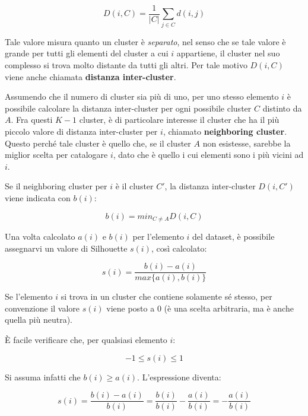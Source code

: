 \documentclass[12pt]{report}
\begin{document}
			\begin{equation*}
				D(i, C) = \frac{1}{|C|} \sum_{j \in C} d(i, j)
			\end{equation*}

			Tale valore misura quanto un cluster è \textit{separato}, nel senso
			che se tale valore è grande per tutti gli elementi del cluster a cui
			$i$ appartiene, il cluster nel suo complesso si trova molto distante
			da tutti gli altri. Per tale motivo $D(i, C)$ viene anche chiamata
			\textbf{distanza inter-cluster}.

			Assumendo che il numero di cluster sia più di uno, per uno stesso elemento
			$i$ è possibile calcolare la distanza inter-cluster per ogni possibile
			cluster $C$ distinto da $A$. Fra questi $K - 1$ cluster, è di particolare
			interesse il cluster che ha il più piccolo valore di distanza inter-cluster
			per $i$, chiamato \textbf{neighboring cluster}. Questo perché tale cluster
			è quello che, se il cluster $A$ non esistesse, sarebbe la miglior scelta
			per catalogare $i$, dato che è quello i cui elementi sono i più vicini ad
			$i$.

			Se il neighboring cluster per $i$ è il cluster $C'$, la distanza
			inter-cluster $D(i, C')$ viene indicata con $b(i)$:

			\begin{equation}
				b(i) = min_{C \neq A} D(i, C)
			\end{equation}

			Una volta calcolato $a(i)$ e $b(i)$ per l'elemento $i$ del dataset, è
			possibile assegnarvi un valore di Silhouette $s(i)$, così calcolato:

			\begin{equation}
				s(i) = \frac{b(i) - a(i)}{max\{a(i), b(i)\}}
			\end{equation}

			Se l'elemento $i$ si trova in un cluster che contiene solamente sé stesso,
			per convenzione il valore $s(i)$ viene posto a $0$ (è una scelta arbitraria,
			ma è anche quella più neutra).

			È facile verificare che, per qualsiasi elemento $i$:

			\begin{equation*}
				-1 \leq s(i) \leq 1
			\end{equation*}

			Si assuma infatti che $b(i) \geq a(i)$. L'espressione diventa:

			\begin{equation*}
				s(i) = \frac{b(i) - a(i)}{b(i)} =
				\frac{b(i)}{b(i)} - \frac{a(i)}{b(i)} =
				- \frac{a(i)}{b(i)}
			\end{equation*}
\end{document}
